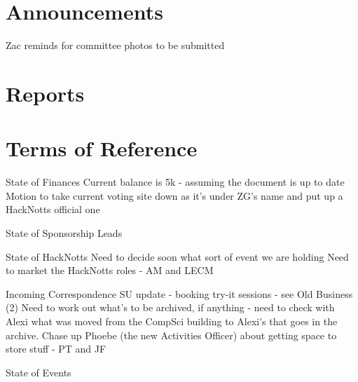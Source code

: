 \documentclass[11pt,hacksoc]{meetingmins}
\begin{document}
\maketitle

\section{Announcements}
\begin{items}
\item Zac reminds for committee photos to be submitted
\end{items}

\section{Reports}

\section{Terms of Reference}
\begin{items}
\item {State of Finances}
    \subitem Current balance is 5k - assuming the document is up to date
    \subitem Motion to take current voting site down as it's under ZG's  name and put up a HackNotts official one
\item {State of Sponsorship Leads}
\item {State of HackNotts}
    \subitem Need to decide soon what sort of event we are holding
    \subitem Need to market the HackNotts roles - AM and LECM
\item {Incoming Correspondence}
    \subitem SU update - booking try-it sessions - see Old Business (2)
    \subitem Need to work out what's to be archived, if anything - need to check with Alexi what was moved from the CompSci building to Alexi's that goes in the archive. 
    Chase up Phoebe (the new Activities Officer) about getting space to store stuff - PT and JF
\item {State of Events}
\end{items}
\end{document}
